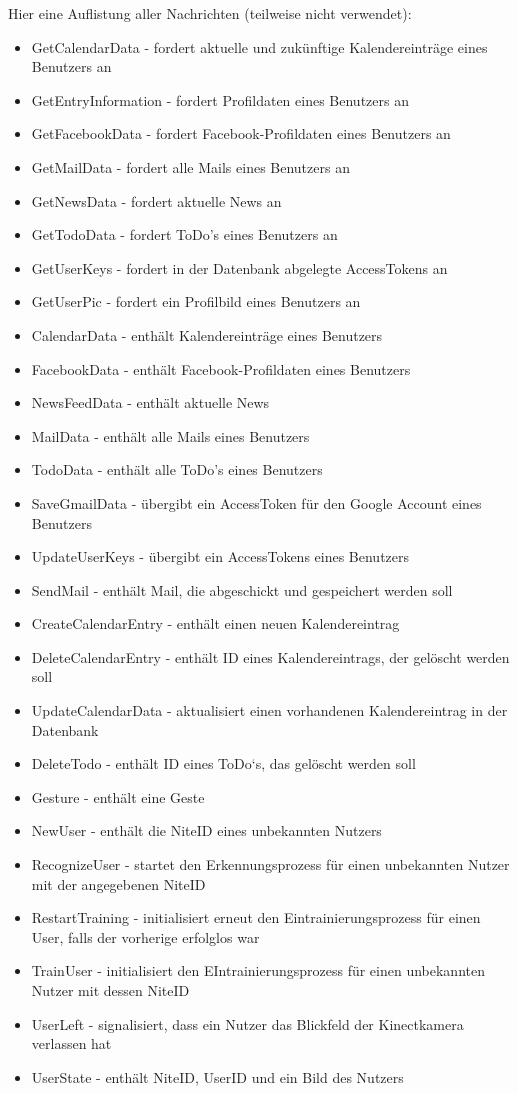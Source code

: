 \documentclass[10pt,a4paper]{report}
\begin{document}
        Hier eine Auflistung aller Nachrichten (teilweise nicht verwendet): 
        \begin{itemize}
        	\item GetCalendarData - fordert aktuelle und zukünftige Kalendereinträge eines Benutzers an
			\item GetEntryInformation - fordert Profildaten eines Benutzers an
			\item GetFacebookData - fordert Facebook-Profildaten eines Benutzers an
			\item GetMailData - fordert alle Mails eines Benutzers an
			\item GetNewsData - fordert aktuelle News an
			\item GetTodoData - fordert ToDo's eines Benutzers an
			\item GetUserKeys - fordert in der Datenbank abgelegte AccessTokens an
			\item GetUserPic -	fordert ein Profilbild eines Benutzers an
			\item CalendarData - enthält Kalendereinträge eines Benutzers
			\item FacebookData - enthält Facebook-Profildaten eines Benutzers
			\item NewsFeedData - enthält aktuelle News
			\item MailData - enthält alle Mails eines Benutzers
			\item TodoData - enthält alle ToDo's eines Benutzers
			\item SaveGmailData - übergibt ein AccessToken für den Google Account eines Benutzers
			\item UpdateUserKeys - übergibt ein AccessTokens eines Benutzers
			\item SendMail - enthält Mail, die abgeschickt und gespeichert werden soll
			\item CreateCalendarEntry - enthält einen neuen Kalendereintrag
			\item DeleteCalendarEntry - enthält ID eines Kalendereintrags, der gelöscht werden soll
			\item UpdateCalendarData - aktualisiert einen vorhandenen Kalendereintrag in der Datenbank
			\item DeleteTodo - enthält ID eines ToDo`s, das gelöscht werden soll
			\item Gesture - enthält eine Geste
			\item NewUser - enthält die NiteID eines unbekannten Nutzers
			\item RecognizeUser - startet den Erkennungsprozess für einen unbekannten Nutzer mit der angegebenen NiteID
			\item RestartTraining - initialisiert erneut den Eintrainierungsprozess für einen User, falls der vorherige erfolglos war
			\item TrainUser - initialisiert den EIntrainierungsprozess für einen unbekannten Nutzer mit dessen NiteID
			\item UserLeft - signalisiert, dass ein Nutzer das Blickfeld der Kinectkamera verlassen hat
			\item UserState - enthält NiteID, UserID und ein Bild des Nutzers
        \end{itemize}
\end{document}
